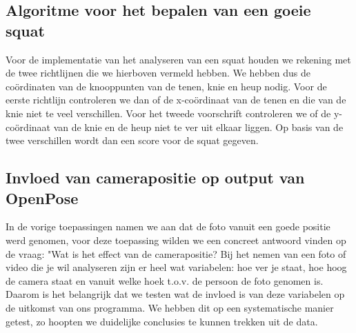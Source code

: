 \documentclass[a4paper,twoside,kulak]{kulakreport}
\begin{document}
\subsection{Algoritme voor het bepalen van een goeie squat}
Voor de implementatie van het analyseren van een squat houden we rekening met de twee richtlijnen die we hierboven vermeld hebben. We hebben dus de coördinaten van de knooppunten van de tenen, knie en heup nodig. Voor de eerste richtlijn controleren we dan of de x-coördinaat van de tenen en die van de knie niet te veel verschillen. Voor het tweede voorschrift controleren we of de y-coördinaat van de knie en de heup niet te ver uit elkaar liggen. Op basis van de twee verschillen wordt dan een score voor de squat gegeven.


\subsection{Invloed van camerapositie op output van OpenPose} \label{camerapositie}
In de vorige toepassingen namen we aan dat de foto vanuit een goede positie werd genomen, voor deze toepassing wilden we een concreet antwoord vinden op de vraag: "Wat is het effect van de camerapositie? Bij het nemen van een foto of video die je wil analyseren zijn er heel wat variabelen: hoe ver je staat, hoe hoog de camera staat en vanuit welke hoek t.o.v. de persoon de foto genomen is. Daarom is het belangrijk dat we testen wat de invloed is van deze variabelen op de uitkomst van ons programma. We hebben dit op een systematische manier getest, zo hoopten we duidelijke conclusies te kunnen trekken uit de data.
\end{document}
